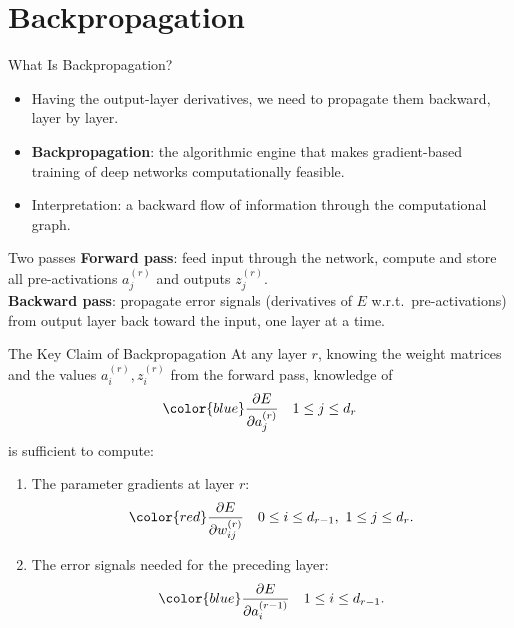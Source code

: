 \section{Backpropagation}

\begin{frame}{What Is Backpropagation?}
  \begin{itemize}
    \item Having the output-layer derivatives, we need to propagate them \alert{backward}, layer by layer.
    \item \textbf{Backpropagation}: the algorithmic engine that makes gradient-based training of deep networks computationally feasible.
    \item Interpretation: a \alert{backward flow of information} through the computational graph.
  \end{itemize}
  \begin{block}{Two passes}
    \textbf{Forward pass}: feed input through the network, compute and \alert{store} all pre-activations $a_j^{(r)}$ and outputs $z_j^{(r)}$.\\[0.3em]
    \textbf{Backward pass}: propagate \alert{error signals} (derivatives of $E$ w.r.t.\ pre-activations) from output layer back toward the input, one layer at a time.
  \end{block}
\end{frame}

\begin{frame}{The Key Claim of Backpropagation}
  At any layer $r$, knowing the weight matrices and the values $a_i^{(r)}, z_i^{(r)}$ from the forward pass, knowledge of
  \[
    {\color{blue}\frac{\partial E}{\partial a_j^{(r)}}} \quad 1 \le j \le d_r
  \]
  is sufficient to compute:
  \begin{enumerate}
    \item The \alert{parameter gradients} at layer $r$:
    \[
      {\color{red}\frac{\partial E}{\partial w_{ij}^{(r)}}} \quad 0 \le i \le d_{r-1},\ 1 \le j \le d_r.
    \]
    \item The \alert{error signals} needed for the preceding layer:
    \[
      {\color{blue}\frac{\partial E}{\partial a_i^{(r-1)}}} \quad 1 \le i \le d_{r-1}.
    \]
  \end{enumerate}
\end{frame}

